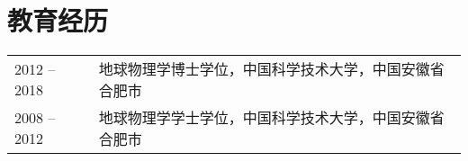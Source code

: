 \section*{教育经历}
\begin{tabular}{p{} p{}}
2012 -- 2018 & 地球物理学博士学位，中国科学技术大学，中国安徽省合肥市 \\
2008 -- 2012 & 地球物理学学士学位，中国科学技术大学，中国安徽省合肥市
\end{tabular}
